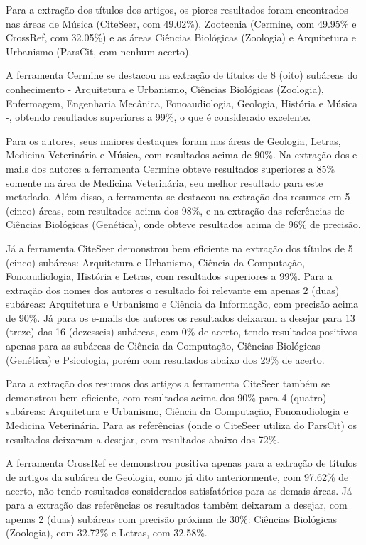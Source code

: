 Para a extração dos títulos dos artigos, os piores resultados foram encontrados nas áreas de Música (CiteSeer, com 49.02\%), Zootecnia (Cermine, com 49.95\% e CrossRef, com 32.05\%) e as áreas Ciências Biológicas (Zoologia) e Arquitetura e Urbanismo (ParsCit, com nenhum acerto).

A ferramenta Cermine se destacou na extração de títulos de 8 (oito) subáreas do conhecimento - Arquitetura e Urbanismo, Ciências Biológicas (Zoologia), Enfermagem, Engenharia Mecânica, Fonoaudiologia, Geologia, História e Música -, obtendo resultados superiores a 99\%, o que é considerado excelente. 

Para os autores, seus maiores destaques foram nas áreas de Geologia, Letras, Medicina Veterinária e Música, com resultados acima de 90\%. Na extração dos e-mails dos autores a ferramenta Cermine obteve resultados superiores a 85\% somente na área de Medicina Veterinária, seu melhor resultado para este metadado. Além disso, a ferramenta se destacou na extração dos resumos em 5 (cinco) áreas, com resultados acima dos 98\%, e na extração das referências de Ciências Biológicas (Genética), onde obteve resultados acima de 96\% de precisão.

Já a ferramenta CiteSeer demonstrou bem eficiente na extração dos títulos de 5 (cinco) subáreas: Arquitetura e Urbanismo, Ciência da Computação, Fonoaudiologia, História e Letras, com resultados superiores a 99\%. Para a extração dos nomes dos autores o resultado foi relevante em apenas 2 (duas) subáreas: Arquitetura e Urbanismo e Ciência da Informação, com precisão acima de 90\%. Já para os e-mails dos autores os resultados deixaram a desejar para 13 (treze) das 16 (dezesseis) subáreas, com 0\% de acerto, tendo resultados positivos apenas para as subáreas de Ciência da Computação, Ciências Biológicas (Genética) e Psicologia, porém com resultados abaixo dos 29\% de acerto.

Para a extração dos resumos dos artigos a ferramenta CiteSeer também se demonstrou bem eficiente, com resultados acima dos 90\% para 4 (quatro) subáreas: Arquitetura e Urbanismo, Ciência da Computação, Fonoaudiologia e Medicina Veterinária. Para as referências (onde o CiteSeer utiliza do ParsCit) os resultados deixaram a desejar, com resultados abaixo dos 72\%.

A ferramenta CrossRef se demonstrou positiva apenas para a extração de títulos de artigos da subárea de Geologia, como já dito anteriormente, com 97.62\% de acerto, não tendo resultados considerados satisfatórios para as demais áreas. Já para a extração das referências os resultados também deixaram a desejar, com apenas 2 (duas) subáreas com precisão próxima de 30\%: Ciências Biológicas (Zoologia), com 32.72\% e Letras, com 32.58\%.


